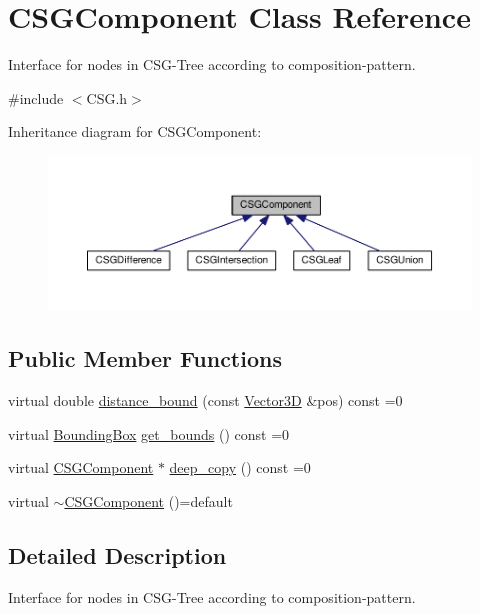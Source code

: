 \hypertarget{classCSGComponent}{}\section{C\+S\+G\+Component Class Reference}
\label{classCSGComponent}


Interface for nodes in C\+S\+G-\/\+Tree according to composition-\/pattern.  




{\ttfamily \#include $<$C\+S\+G.\+h$>$}



Inheritance diagram for C\+S\+G\+Component\+:\nopagebreak
\begin{figure}[H]
\begin{center}
\leavevmode
\includegraphics[width=350pt]{classCSGComponent__inherit__graph}
\end{center}
\end{figure}
\subsection*{Public Member Functions}
\begin{DoxyCompactItemize}
\item 
virtual double \hyperlink{classCSGComponent_a41ca7aff9b7c481ea076f81eeb826779}{distance\+\_\+bound} (const \hyperlink{classVector3D}{Vector3D} \&pos) const =0
\item 
virtual \hyperlink{classBoundingBox}{Bounding\+Box} \hyperlink{classCSGComponent_a4299365f2bab69272af9de4f2bee7cdb}{get\+\_\+bounds} () const =0
\item 
virtual \hyperlink{classCSGComponent}{C\+S\+G\+Component} $\ast$ \hyperlink{classCSGComponent_a98d3accd23c28259cbf490f4d7acbe83}{deep\+\_\+copy} () const =0
\item 
virtual \hyperlink{classCSGComponent_ab46aa06021795ff83ff2fdf991e5e77d}{$\sim$\+C\+S\+G\+Component} ()=default
\end{DoxyCompactItemize}


\subsection{Detailed Description}
Interface for nodes in C\+S\+G-\/\+Tree according to composition-\/pattern. 

